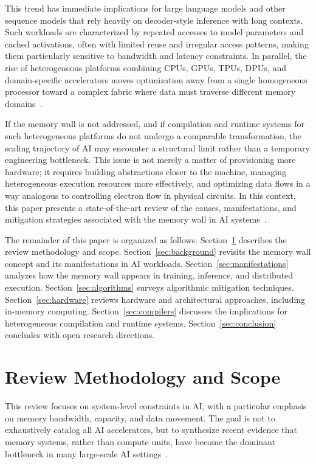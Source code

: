 \documentclass[conference]{IEEEtran}
\begin{document}
This trend has immediate implications for large language models and other sequence models that rely heavily on decoder-style inference with long contexts. Such workloads are characterized by repeated accesses to model parameters and cached activations, often with limited reuse and irregular access patterns, making them particularly sensitive to bandwidth and latency constraints. In parallel, the rise of heterogeneous platforms combining CPUs, GPUs, TPUs, DPUs, and domain-specific accelerators moves optimization away from a single homogeneous processor toward a complex fabric where data must traverse different memory domains~\cite{gholami2024ai,roy2025breaking}.

If the memory wall is not addressed, and if compilation and runtime systems for such heterogeneous platforms do not undergo a comparable transformation, the scaling trajectory of AI may encounter a structural limit rather than a temporary engineering bottleneck. This issue is not merely a matter of provisioning more hardware; it requires building abstractions closer to the machine, managing heterogeneous execution resources more effectively, and optimizing data flows in a way analogous to controlling electron flow in physical circuits. In this context, this paper presents a state-of-the-art review of the causes, manifestations, and mitigation strategies associated with the memory wall in AI systems~\cite{gholami2024ai,roy2025breaking}.

The remainder of this paper is organized as follows. Section~\ref{sec:methodology} describes the review methodology and scope. Section~\ref{sec:background} revisits the memory wall concept and its manifestations in AI workloads. Section~\ref{sec:manifestations} analyzes how the memory wall appears in training, inference, and distributed execution. Section~\ref{sec:algorithms} surveys algorithmic mitigation techniques. Section~\ref{sec:hardware} reviews hardware and architectural approaches, including in-memory computing. Section~\ref{sec:compilers} discusses the implications for heterogeneous compilation and runtime systems. Section~\ref{sec:conclusion} concludes with open research directions.

\section{Review Methodology and Scope}
\label{sec:methodology}

This review focuses on system-level constraints in AI, with a particular emphasis on memory bandwidth, capacity, and data movement. The goal is not to exhaustively catalog all AI accelerators, but to synthesize recent evidence that memory systems, rather than compute units, have become the dominant bottleneck in many large-scale AI settings~\cite{gholami2024ai}.
\end{document}

